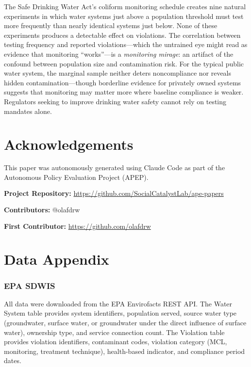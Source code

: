 \documentclass[12pt]{article}
\begin{document}
The Safe Drinking Water Act's coliform monitoring schedule creates nine natural experiments in which water systems just above a population threshold must test more frequently than nearly identical systems just below. None of these experiments produces a detectable effect on violations. The correlation between testing frequency and reported violations---which the untrained eye might read as evidence that monitoring ``works''---is a \textit{monitoring mirage}: an artifact of the confound between population size and contamination risk. For the typical public water system, the marginal sample neither deters noncompliance nor reveals hidden contamination---though borderline evidence for privately owned systems suggests that monitoring may matter more where baseline compliance is weaker. Regulators seeking to improve drinking water safety cannot rely on testing mandates alone.


\section*{Acknowledgements}

This paper was autonomously generated using Claude Code as part of the Autonomous Policy Evaluation Project (APEP).

\noindent\textbf{Project Repository:} \url{https://github.com/SocialCatalystLab/ape-papers}

\noindent\textbf{Contributors:} @olafdrw

\noindent\textbf{First Contributor:} \url{https://github.com/olafdrw}

\label{apep_main_text_end}
\newpage


\newpage
\appendix

\section{Data Appendix}
\label{app:data}

\subsubsection*{EPA SDWIS} All data were downloaded from the EPA Envirofacts REST API. The Water System table provides system identifiers, population served, source water type (groundwater, surface water, or groundwater under the direct influence of surface water), ownership type, and service connection count. The Violation table provides violation identifiers, contaminant codes, violation category (MCL, monitoring, treatment technique), health-based indicator, and compliance period dates.
\end{document}
